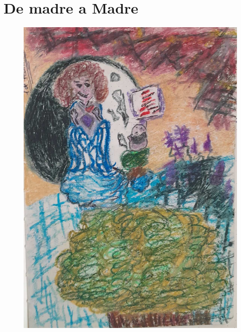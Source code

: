 \documentclass[12pt, a4paper, twoside]{book} %
\begin{document}
\chapter{De madre a Madre}

\begin{figure}[H]
	\centering
	\includegraphics[width=\textwidth]{./images/1f81324dd8aaa9.jpg}
\end{figure}
\end{document}
